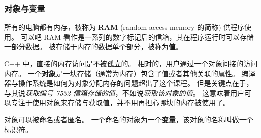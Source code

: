\documentclass[../../LearnCpp.tex]{subfiles}
\begin{document}

\subsubsection*{对象与变量}

所有的电脑都有内存，被称为 \textbf{RAM} (random access memory 的简称) 供程序使用。
可以吧 RAM 看作是一系列的数字标记后的信箱，其在程序运行时可以存储一部分数据。
被存储于内存的数据单个部分，被称为\textbf{值}。

C++ 中，直接的内存访问是不被孤立的。
相对的，用户通过一个对象间接的访问内存。
一个\textbf{对象}是一块存储（通常为内存）包含了值或者其他关联的属性。
编译器与操作系统是如何为对象分配内存的问题超出了这个课程。
但是关键点在于，与其说\textit{获取编号 7532 信箱存储的值}，不如说\textit{获取该对象的值}。
这意味着用户可以专注于使用对象来存储与获取值，并不用再担心哪块的内存被使用了。

对象可以被命名或者匿名。
一个命名的对象为一个\textbf{变量}，该对象的名称叫做一个标识符。
\end{document}
